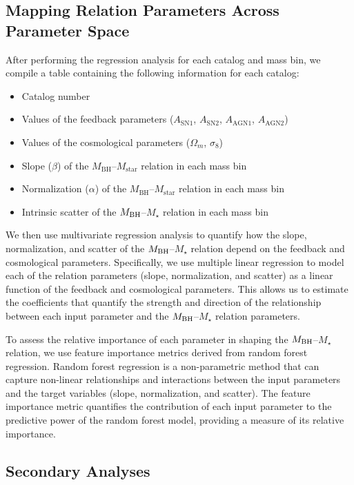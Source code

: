 \documentclass[twocolumn]{aastex631}
\begin{document}
\subsection{Mapping Relation Parameters Across Parameter Space}

After performing the regression analysis for each catalog and mass bin, we compile a table containing the following information for each catalog:

\begin{itemize}
    \item Catalog number
    \item Values of the feedback parameters ($A_\mathrm{SN1}$, $A_\mathrm{SN2}$, $A_\mathrm{AGN1}$, $A_\mathrm{AGN2}$)
    \item Values of the cosmological parameters ($\Omega_m$, $\sigma_8$)
    \item Slope ($\beta$) of the $M_\mathrm{BH}$--$M_\mathrm{star}$ relation in each mass bin
    \item Normalization ($\alpha$) of the $M_\mathrm{BH}$--$M_\mathrm{star}$ relation in each mass bin
    \item Intrinsic scatter of the $M_{\rm BH}$--$M_{\star}$ relation in each mass bin
\end{itemize}

We then use multivariate regression analysis to quantify how the slope, normalization, and scatter of the $M_{\rm BH}$--$M_{\star}$ relation depend on the feedback and cosmological parameters. Specifically, we use multiple linear regression to model each of the relation parameters (slope, normalization, and scatter) as a linear function of the feedback and cosmological parameters. This allows us to estimate the coefficients that quantify the strength and direction of the relationship between each input parameter and the $M_{\rm BH}$--$M_{\star}$ relation parameters.

To assess the relative importance of each parameter in shaping the $M_{\rm BH}$--$M_{\star}$ relation, we use feature importance metrics derived from random forest regression. Random forest regression is a non-parametric method that can capture non-linear relationships and interactions between the input parameters and the target variables (slope, normalization, and scatter). The feature importance metric quantifies the contribution of each input parameter to the predictive power of the random forest model, providing a measure of its relative importance.

\subsection{Secondary Analyses}
\end{document}
